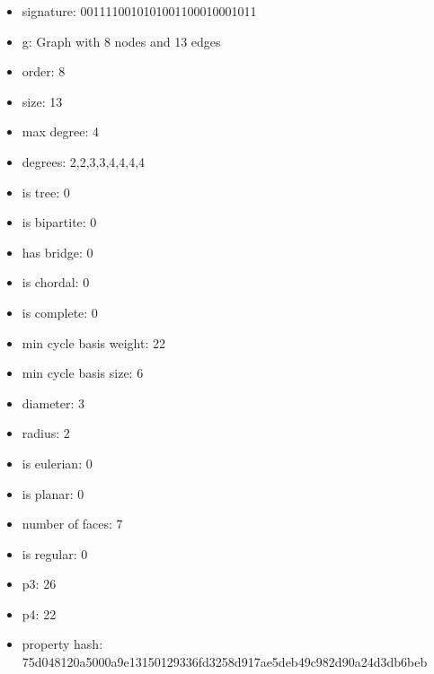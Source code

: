 \begin{itemize}
\item signature: 0011110010101001100010001011
\item g: Graph with 8 nodes and 13 edges
\item order: 8
\item size: 13
\item max degree: 4
\item degrees: 2,2,3,3,4,4,4,4
\item is tree: 0
\item is bipartite: 0
\item has bridge: 0
\item is chordal: 0
\item is complete: 0
\item min cycle basis weight: 22
\item min cycle basis size: 6
\item diameter: 3
\item radius: 2
\item is eulerian: 0
\item is planar: 0
\item number of faces: 7
\item is regular: 0
\item p3: 26
\item p4: 22
\item property hash: 75d048120a5000a9e13150129336fd3258d917ae5deb49c982d90a24d3db6beb
\end{itemize}
\newpage
\begin{figure}
\end{figure}
